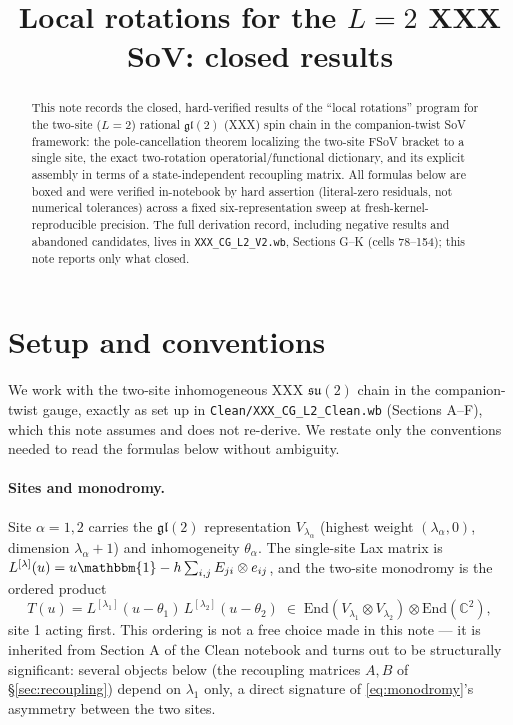 \documentclass[11pt]{article}
\title{Local rotations for the $L=2$ XXX SoV: closed results}
\author{}
\date{}
\newcommand{\Ident}{\mathbbm{1}}
\begin{document}
\maketitle

\begin{abstract}
\noindent
This note records the closed, hard-verified results of the ``local rotations'' program for the
two-site ($L=2$) rational $\mathfrak{gl}(2)$ (XXX) spin chain in the companion-twist SoV framework:
the pole-cancellation theorem localizing the two-site FSoV bracket to a single site, the exact
two-rotation operatorial/functional dictionary, and its explicit assembly in terms of a
state-independent recoupling matrix. All formulas below are boxed and were verified in-notebook by
hard assertion (literal-zero residuals, not numerical tolerances) across a fixed six-representation
sweep at fresh-kernel-reproducible precision. The full derivation record, including negative results
and abandoned candidates, lives in \texttt{XXX\_CG\_L2\_V2.wb}, Sections G--K (cells 78--154); this
note reports only what closed.
\end{abstract}

\section{Setup and conventions}
\label{sec:setup}

We work with the two-site inhomogeneous XXX $\mathfrak{su}(2)$ chain in the companion-twist gauge,
exactly as set up in \texttt{Clean/XXX\_CG\_L2\_Clean.wb} (Sections A--F), which this note assumes
and does not re-derive. We restate only the conventions needed to read the formulas below without
ambiguity.

\paragraph{Sites and monodromy.} Site $\alpha=1,2$ carries the $\mathfrak{gl}(2)$ representation
$V_{\lambda_\alpha}$ (highest weight $(\lambda_\alpha,0)$, dimension $\lambda_\alpha+1$) and
inhomogeneity $\theta_\alpha$. The single-site Lax matrix is
$L^{[\lambda]}(u) = u\Ident - h\sum_{i,j} E_{ji}\otimes e_{ij}$, and the two-site monodromy is the
ordered product
\begin{equation}
  T(u) = L^{[\lambda_1]}(u-\theta_1)\, L^{[\lambda_2]}(u-\theta_2) \;\in\;
  \mathrm{End}(V_{\lambda_1}\otimes V_{\lambda_2})\otimes\mathrm{End}(\mathbb{C}^2),
  \label{eq:monodromy}
\end{equation}
site 1 acting first. This ordering is not a free choice made in this note --- it is inherited from
Section A of the Clean notebook and turns out to be structurally significant: several objects below
(the recoupling matrices $A,B$ of \S\ref{sec:recoupling}) depend on $\lambda_1$ only, a direct
signature of \eqref{eq:monodromy}'s asymmetry between the two sites.
\end{document}
